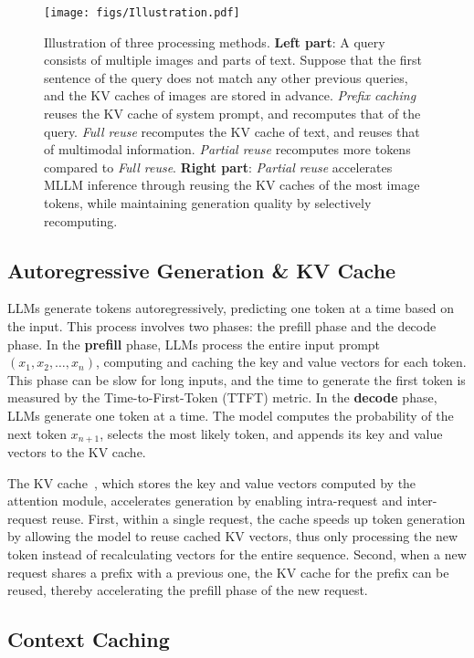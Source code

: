 \begin{figure*}
    \centering
    \texttt{[image: figs/Illustration.pdf]}
    \caption{Illustration of three processing methods. \textbf{Left part}: A query consists of multiple images and parts of text. Suppose that the first sentence of the query does not match any other previous queries, and the KV caches of images are stored in advance. \textit{Prefix caching} reuses the KV cache of system prompt, and recomputes that of the query. \textit{Full reuse} recomputes the KV cache of text, and reuses that of multimodal information. \textit{Partial reuse} recomputes more tokens compared to \textit{Full reuse}. \textbf{Right part}: \textit{Partial reuse} accelerates MLLM inference through reusing the KV caches of the most image tokens, while maintaining generation quality by selectively recomputing.}
    \label{fig:illustration}
\end{figure*}
\subsection{Autoregressive Generation \& KV Cache}
%
LLMs generate tokens autoregressively, predicting one token at a time based on the input. 
This process involves two phases: the prefill phase and the decode phase.
%
In the \textbf{prefill} phase, LLMs process the entire input prompt $(x_1, x_2, \dots, x_n)$, 
computing and caching the key and value vectors for each token. This phase can be slow for long inputs, 
and the time to generate the first token is measured by the Time-to-First-Token (TTFT) metric.
%
In the \textbf{decode} phase, LLMs generate one token at a time. 
The model computes the probability of the next token $x_{n+1}$, 
selects the most likely token, and appends its key and value vectors to the KV cache. 

The KV cache~\cite{pope2023}, 
which stores the key and value vectors computed by the attention module, 
accelerates generation by enabling intra-request and inter-request reuse. 
First, within a single request, the cache speeds up token generation by allowing the model 
to reuse cached KV vectors, thus only processing the new token instead of recalculating 
vectors for the entire sequence. Second, when a new request shares a prefix with a previous one, 
the KV cache for the prefix can be reused, thereby accelerating the prefill phase of the new request.

\subsection{Context Caching}


